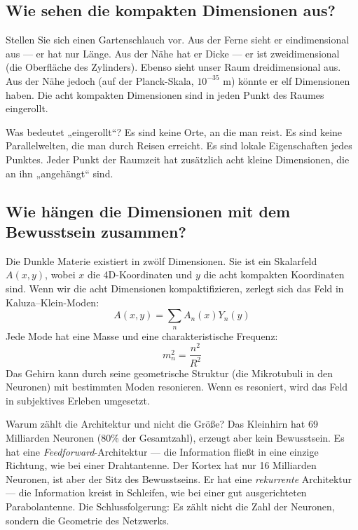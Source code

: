 \documentclass[11pt,a4paper]{article}
\begin{document}
\subsection{Wie sehen die kompakten Dimensionen aus?}
Stellen Sie sich einen Gartenschlauch vor. Aus der Ferne sieht er eindimensional aus --- er hat nur Länge. Aus der Nähe hat er Dicke --- er ist zweidimensional (die Oberfläche des Zylinders). Ebenso sieht unser Raum dreidimensional aus. Aus der Nähe jedoch (auf der Planck-Skala, $10^{-35}$ m) könnte er elf Dimensionen haben. Die acht kompakten Dimensionen sind in jeden Punkt des Raumes eingerollt.

Was bedeutet „eingerollt``? Es sind keine Orte, an die man reist. Es sind keine Parallelwelten, die man durch Reisen erreicht. Es sind lokale Eigenschaften jedes Punktes. Jeder Punkt der Raumzeit hat zusätzlich acht kleine Dimensionen, die an ihn „angehängt`` sind.

\subsection{Wie hängen die Dimensionen mit dem Bewusstsein zusammen?}
Die Dunkle Materie existiert in zwölf Dimensionen. Sie ist ein Skalarfeld $A(x,y)$, wobei $x$ die 4D-Koordinaten und $y$ die acht kompakten Koordinaten sind. Wenn wir die acht Dimensionen kompaktifizieren, zerlegt sich das Feld in Kaluza--Klein-Moden:
\begin{equation}
A(x,y) = \sum_n A_n(x) Y_n(y)
\end{equation}
Jede Mode hat eine Masse und eine charakteristische Frequenz:
\begin{equation}
m_n^2 = \frac{n^2}{R^2}
\end{equation}
Das Gehirn kann durch seine geometrische Struktur (die Mikrotubuli in den Neuronen) mit bestimmten Moden resonieren. Wenn es resoniert, wird das Feld in subjektives Erleben umgesetzt.

Warum zählt die Architektur und nicht die Größe? Das Kleinhirn hat 69 Milliarden Neuronen (80\% der Gesamtzahl), erzeugt aber kein Bewusstsein. Es hat eine \textit{Feedforward}-Architektur --- die Information fließt in eine einzige Richtung, wie bei einer Drahtantenne. Der Kortex hat nur 16 Milliarden Neuronen, ist aber der Sitz des Bewusstseins. Er hat eine \textit{rekurrente} Architektur --- die Information kreist in Schleifen, wie bei einer gut ausgerichteten Parabolantenne. Die Schlussfolgerung: Es zählt nicht die Zahl der Neuronen, sondern die Geometrie des Netzwerks.
\end{document}

